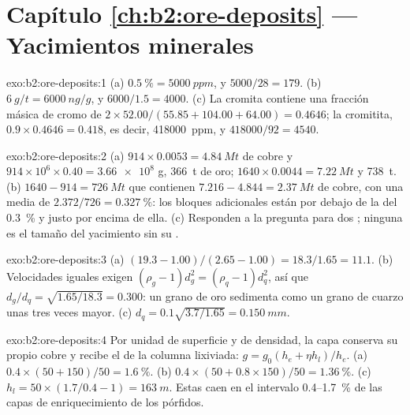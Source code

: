 \section*{Capítulo \ref{ch:b2:ore-deposits} --- Yacimientos minerales}

\begin{solution}{exo:b2:ore-deposits:1}
(a) $\qty{0.5}{\percent} = \qty{5000}{ppm}$, y $5000/28 = 179$. (b) $\qty{6}{g/t} = \qty{6000}{ng/g}$,
y $6000/1.5 = 4000$. (c) La cromita contiene una fracción másica de cromo de $2 \times 52.00/(55.85 + 104.00 + 64.00) = 0.4646$;
la cromitita, $0.9 \times 0.4646 = 0.418$, es decir, \qty{418000}{ppm}, y
$418000/92 = 4540$.
\end{solution}

\begin{solution}{exo:b2:ore-deposits:2}
(a) $914 \times 0.0053 = \qty{4.84}{Mt}$ de cobre y $914 \times 10^6 \times 0.40 = \num{3.66e8}$ g,
\qty{366}{t} de oro; $1640 \times 0.0044 = \qty{7.22}{Mt}$ y \qty{738}{t}. (b) $1640 - 914 =
\qty{726}{Mt}$ que contienen $7.216 - 4.844 = \qty{2.37}{Mt}$ de cobre, con una  media de
$2.372/726 = \qty{0.327}{\percent}$: los bloques adicionales están por debajo de la  del \qty{0.3}{\percent}
y justo por encima de ella. (c) Responden a la pregunta para dos ; ninguna es el tamaño del
yacimiento sin su .
\end{solution}

\begin{solution}{exo:b2:ore-deposits:3}
(a) $(19.3 - 1.00)/(2.65 - 1.00) = 18.3/1.65 = 11.1$. (b) Velocidades iguales exigen $(\rho_g - 1)d_g^2 =
(\rho_q - 1)d_q^2$, así que $d_g/d_q = \sqrt{1.65/18.3} = 0.300$: un grano de oro sedimenta como un grano de cuarzo
unas tres veces mayor. (c) $d_q = 0.1\sqrt{3.7/1.65} = \qty{0.150}{mm}$.
\end{solution}

\begin{solution}{exo:b2:ore-deposits:4}
Por unidad de superficie y de densidad, la capa conserva su propio cobre y recibe el de la columna
lixiviada: $g = g_0(h_e + \eta h_l)/h_e$. (a) $0.4 \times (50 + 150)/50 = \qty{1.6}{\percent}$.
(b) $0.4 \times (50 + 0.8 \times 150)/50 = \qty{1.36}{\percent}$. (c) $h_l = 50 \times (1.7/0.4 - 1)
= \qty{163}{m}$. Estas  caen en el intervalo 0.4--\qty{1.7}{\percent} de las capas de enriquecimiento
de los pórfidos.
\end{solution}

